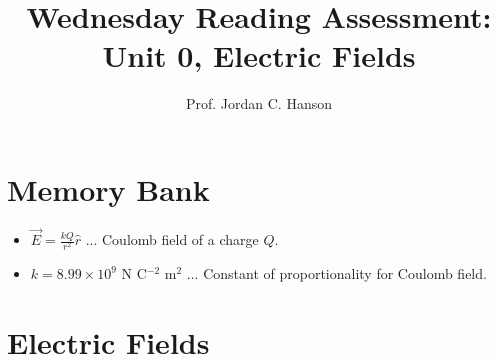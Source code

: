 \documentclass{article}
\begin{document}
\title{Wednesday Reading Assessment: Unit 0, Electric Fields}
\author{Prof. Jordan C. Hanson}

\maketitle

\section{Memory Bank}

\large
\begin{itemize}
\item $\vec{E} = \frac{k Q}{r^2} \hat{r}$ ... Coulomb field of a charge $Q$.
\item $k = 8.99 \times 10^{9}$ N C$^{-2}$ m$^{2}$ ... Constant of proportionality for Coulomb field.
\end{itemize}
\normalsize

\section{Electric Fields}
\end{document}
